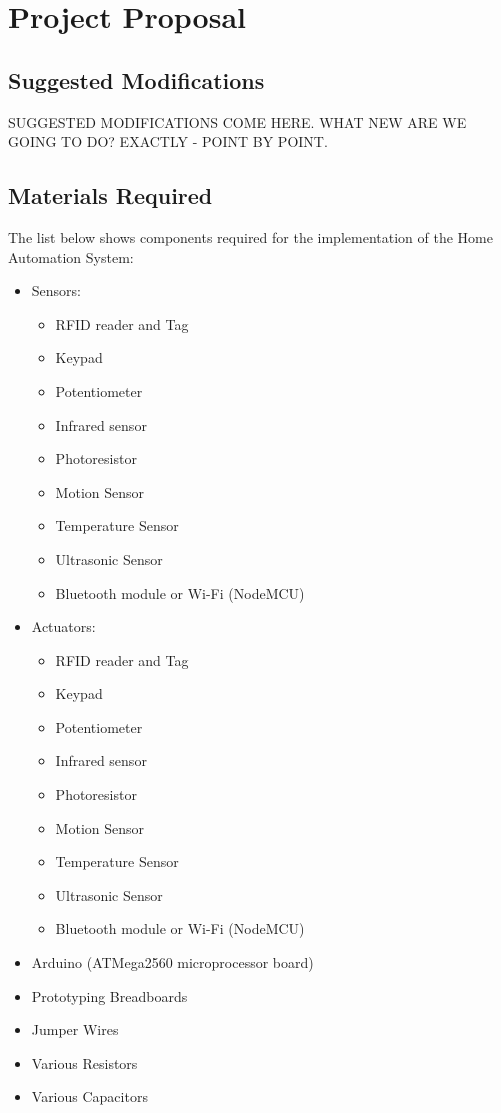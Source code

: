 \documentclass[journal]{IEEEtran}
\begin{document}
\section{Project Proposal}

\subsection{Suggested Modifications}
SUGGESTED MODIFICATIONS COME HERE. WHAT NEW ARE WE GOING TO DO? EXACTLY - POINT BY POINT.

\subsection{Materials Required}
The list below shows components required for the implementation of the Home Automation System:
\begin{itemize}
	\item{Sensors:}
	\begin{itemize}
		\item{RFID reader and Tag}
		\item{Keypad}
		\item{Potentiometer}
		\item{Infrared sensor}
		\item{Photoresistor}
		\item{Motion Sensor}
		\item{Temperature Sensor}
		\item{Ultrasonic Sensor}
		\item{Bluetooth module or Wi-Fi (NodeMCU)}
	\end{itemize} 
	\item{Actuators:}
	\begin{itemize}
		\item{RFID reader and Tag}
		\item{Keypad}
		\item{Potentiometer}
		\item{Infrared sensor}
		\item{Photoresistor}
		\item{Motion Sensor}
		\item{Temperature Sensor}
		\item{Ultrasonic Sensor}
		\item{Bluetooth module or Wi-Fi (NodeMCU)}
	\end{itemize} 
	\item{Arduino (ATMega2560 microprocessor board)}
	\item{Prototyping Breadboards}
	\item{Jumper Wires}
	\item{Various Resistors}
	\item{Various Capacitors}
\end{itemize}
\end{document}
